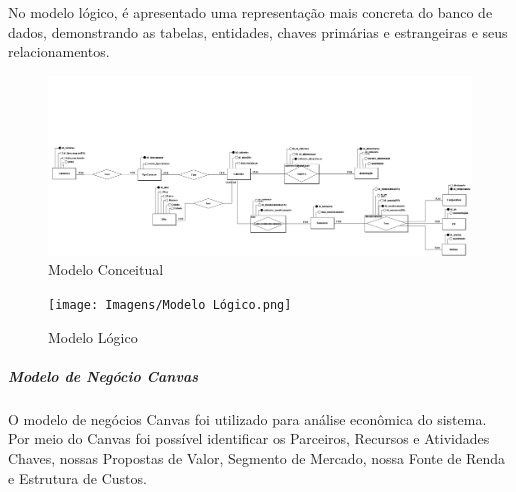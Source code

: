 No modelo lógico, é apresentado uma representação mais concreta do banco de dados, demonstrando as tabelas, entidades, chaves primárias e estrangeiras e seus relacionamentos.

\begin{landscape}
\begin{figure}[!htb]
\caption{Modelo Conceitual}%
\label{fig:conceitual}
\includegraphics[width = 1.5\CaptionWidth]{Imagens/Modelo Conceitual.png}
\end{figure}

\begin{figure}[!htb]
\caption{Modelo Lógico}%
\label{fig:logico}
\texttt{[image: Imagens/Modelo Lógico.png]}
\end{figure}

\end{landscape}

\subparagraph*{\textbf{Modelo de Negócio Canvas}}

O modelo de negócios Canvas foi utilizado para análise econômica do sistema. Por meio do Canvas foi possível identificar os Parceiros, Recursos e Atividades Chaves, nossas Propostas de Valor, Segmento de Mercado, nossa Fonte de Renda e Estrutura de Custos.

